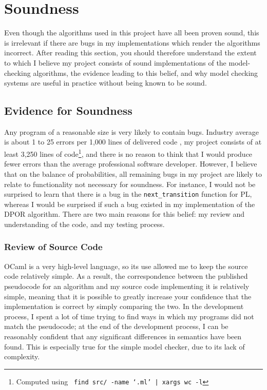\documentclass[12pt,a4paper,twoside,openright]{report}
\begin{document}
\section{Soundness}

Even though the algorithms
used in this project have all been proven sound,
this is irrelevant if there are bugs in my
implementations which render the algorithms incorrect.
After reading this section, you should
therefore understand the extent to which I believe
my project consists of sound implementations
of the model-checking algorithms, the
evidence leading to this belief, and why
model checking systems are useful in
practice without being known to be
sound.

\subsection{Evidence for Soundness}
Any program of a reasonable size is very
likely to contain bugs. Industry average
is about 1 to 25 errors per 1,000 lines
of delivered code \cite{mccon04}, my project
consists of at least 3,250 lines of
code\footnote{Computed using
	\texttt{\,find src/ -name
		\textquoteleft*.ml\textquoteright
		| xargs wc -l}},
and there is no reason to think that I would
produce fewer errors than the average
professional software developer.
However, I believe that
on the balance of probabilities,
all remaining bugs in my project
are likely to relate
to functionality not necessary for
soundness. For instance, I would
not be surprised to learn that there
is a bug in the \texttt{next\_transition}
function for PL, whereas I would be
surprised if such a bug existed in
my implementation of the DPOR
algorithm. There are two main reasons
for this belief: my review and understanding
of the code, and my testing process.

\subsubsection{Review of Source Code}
OCaml is a very high-level language, so
its use allowed me to keep the source code
relatively simple. As a result,
the correspondence between
the published pseudocode for an algorithm
and my source code implementing it is
relatively simple, meaning that it
is possible to greatly increase
your confidence that
the implementation is correct by simply
comparing the two. In the development
process, I spent a lot of time trying
to find ways in which my programs did
not match the pseudocode; at the end
of the development process, I can be
reasonably confident that any significant differences
in semantics have been found.
This is especially
true for the simple model checker,
due to its lack of complexity.
\end{document}
